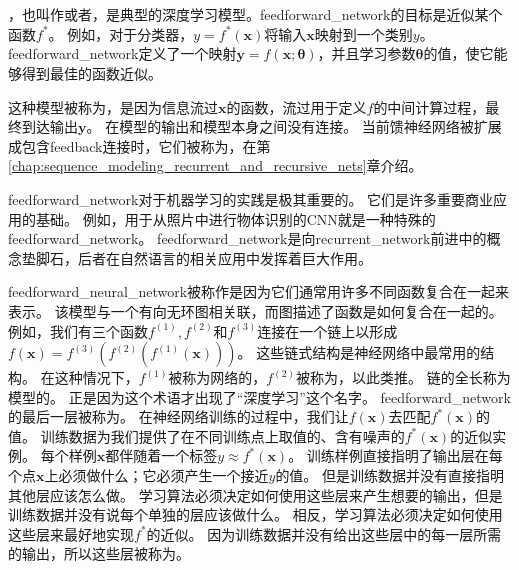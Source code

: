 \chapter{}
\label{chap:deep_feedforward_networks}

，也叫作或者，是典型的深度学习模型。\gls{feedforward_network}的目标是近似某个函数$f^*$。
例如，对于分类器，$y = f^*(\bm{x})$将输入$\bm{x}$映射到一个类别$y$。
\gls{feedforward_network}定义了一个映射$\bm{y} = f(\bm{x}; \bm{\theta})$，并且学习参数$\bm{\theta}$的值，使它能够得到最佳的函数近似。

这种模型被称为，是因为信息流过$\bm{x}$的函数，流过用于定义$f$的中间计算过程，最终到达输出$\bm{y}$。
在模型的输出和模型本身之间没有连接。
当前馈神经网络被扩展成包含\gls{feedback}连接时，它们被称为，在第\ref{chap:sequence_modeling_recurrent_and_recursive_nets}章介绍。

\gls{feedforward_network}对于机器学习的实践是极其重要的。
它们是许多重要商业应用的基础。
例如，用于从照片中进行物体识别的\gls{CNN}就是一种特殊的\gls{feedforward_network}。
\gls{feedforward_network}是向\gls{recurrent_network}前进中的概念垫脚石，后者在自然语言的相关应用中发挥着巨大作用。

\gls{feedforward_neural_network}被称作是因为它们通常用许多不同函数复合在一起来表示。
该模型与一个有向无环图相关联，而图描述了函数是如何复合在一起的。
例如，我们有三个函数$f^{(1)}, f^{(2)}$和$f^{(3)}$连接在一个链上以形成$f(\bm{x}) = f^{(3)}(f^{(2)}(f^{(1)}(\bm{x})) )$。
这些链式结构是神经网络中最常用的结构。
在这种情况下，$f^{(1)}$被称为网络的，$f^{(2)}$被称为，以此类推。
链的全长称为模型的。
正是因为这个术语才出现了``深度学习''这个名字。
\gls{feedforward_network}的最后一层被称为。
在神经网络训练的过程中，我们让$f(\bm{x})$去匹配$f^*(\bm{x})$的值。
训练数据为我们提供了在不同训练点上取值的、含有噪声的$f^*(\bm{x})$的近似实例。
每个样例$\bm{x}$都伴随着一个标签$y\approx f^*(\bm{x})$。
训练样例直接指明了输出层在每个点$\bm{x}$上必须做什么；它必须产生一个接近$y$的值。
但是训练数据并没有直接指明其他层应该怎么做。
学习算法必须决定如何使用这些层来产生想要的输出，但是训练数据并没有说每个单独的层应该做什么。
相反，学习算法必须决定如何使用这些层来最好地实现$f^*$的近似。
因为训练数据并没有给出这些层中的每一层所需的输出，所以这些层被称为。

